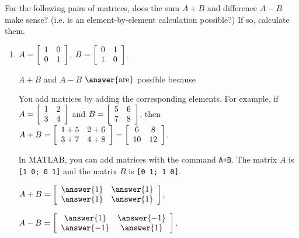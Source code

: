 \documentclass{ximera}
\author{Zack Reed}
\begin{document}
\begin{problem}
    For the following pairs of matrices, does the sum $A+B$ and difference $A-B$ make sense? (i.e. is an element-by-element calculation possible?) If so, calculate them.
    \begin{enumerate}
    \item
      $A = \startmat{cc}
        1 & 0 \\
        0 & 1
      \stopmat$,\quad
      $B = \startmat{cc}
        0 & 1 \\
        1 & 0
      \stopmat$.
  
      
  
        $A+B$ and $A-B$ $\answer{\text{are}}$ possible because 
  
        \begin{selectAll}
        \end{selectAll}

        \begin{hint}
        
          You add matrices by adding the corresponding elements. For example, if $A = \startmat{cc} 1 & 2 \\ 3 & 4 \stopmat$ and $B = \startmat{cc} 5 & 6 \\ 7 & 8 \stopmat$, then $A+B = \startmat{cc} 1+5 & 2+6 \\ 3+7 & 4+8 \stopmat = \startmat{cc} 6 & 8 \\ 10 & 12 \stopmat$.

          In MATLAB, you can add matrices with the command \texttt{A+B}. The matrix $A$ is \texttt{[1 0; 0 1]} and the matrix $B$ is \texttt{[0 1; 1 0]}.

        \end{hint}
  
        $A+B = \startmat{cc}
          \answer{1} & \answer{1} \\
          \answer{1} & \answer{1}
        \stopmat$,\quad
  
        $A-B = \startmat{cc}
          \answer{1} & \answer{-1} \\
          \answer{-1} & \answer{1}
        \stopmat$.
  

\end{enumerate}
\end{problem}
\end{document}
